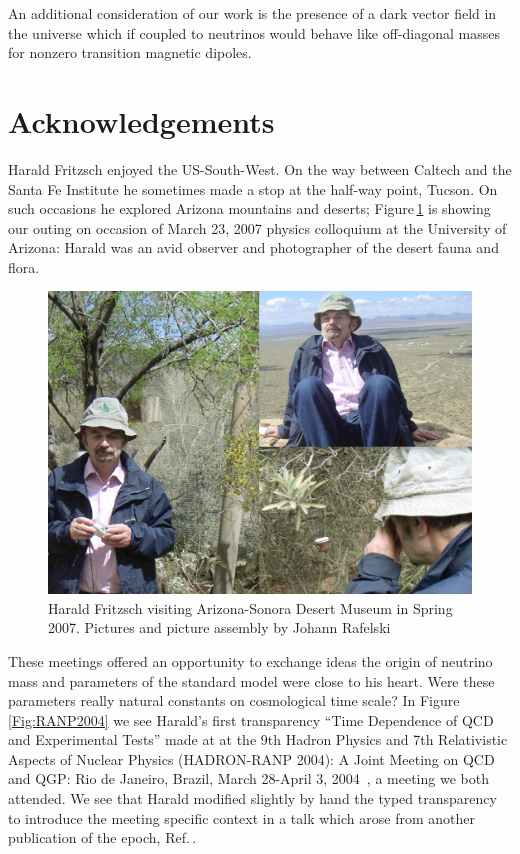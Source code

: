 \documentclass[addchapnum]{ws-rv961x669} %
\begin{document}
An additional consideration of our work is the presence of a dark vector field in the universe which if coupled to neutrinos would behave like off-diagonal masses for nonzero transition magnetic dipoles.

\section*{Acknowledgements}
Harald Fritzsch enjoyed the US-South-West. On the way between Caltech and the Santa Fe Institute he sometimes made a stop at the half-way point, Tucson. On such occasions he explored Arizona mountains and  deserts; Figure\,\ref{Fig:AZcolloq2007} is showing our outing on occasion of March 23, 2007 physics colloquium at the University of Arizona: Harald was an avid observer and photographer of the desert fauna and flora. 
 
\begin{figure}%
\centerline{\includegraphics[width=0.95\columnwidth]{07March24HaraldCollageDesertMuseum.jpg}}
\caption{Harald Fritzsch visiting Arizona-Sonora Desert Museum in Spring 2007. Pictures and picture assembly by Johann Rafelski
}
\label{Fig:AZcolloq2007} 
\end{figure}

These meetings offered an opportunity to exchange ideas the  origin of neutrino mass and parameters of  the standard model were close to his heart. Were these parameters really natural constants on cosmological time scale? In Figure\,\ref{Fig:RANP2004} we see Harald's first transparency ``Time Dependence of QCD and Experimental Tests'' made at at the 9th Hadron Physics and 7th Relativistic Aspects of Nuclear Physics (HADRON-RANP 2004): A Joint Meeting on QCD and QGP: Rio de Janeiro, Brazil, March 28-April 3, 2004~\cite{Fritzsch:2004civ}, a meeting we both attended. We see that Harald modified slightly by hand the typed transparency to introduce the meeting specific context in a talk which arose from another publication of the epoch, Ref.\,\cite{Calmet:2001nu}. 
\end{document}
